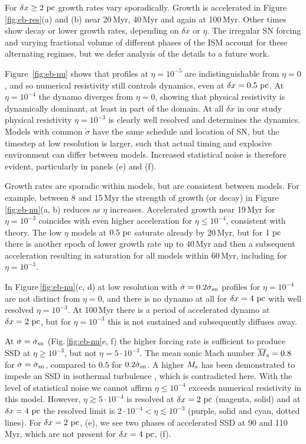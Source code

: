 \documentclass[preprint2]{aastex63}
\newcommand\SNr{\dot\sigma_{\rm sn}}
\newcommand\Ms{M_{\rm s}}
\newcommand\pc{~ {\rm pc}}
\newcommand\dx{ {\delta x}}
\begin{document}
 For $\dx\geq2\pc$ growth rates vary sporadically.
 Growth is accelerated in Figure\,\ref{fig:eb-res}(a) and (b) near 20\,Myr,
 40\,Myr and again at 100\,Myr.
 Other times show decay or lower growth rates, depending on $\dx$ or $\eta$.
 The irregular SN forcing and varying fractional volume of different phases of
 the ISM account for these alternating regimes, but we defer analysis of the
 details to a future work.
 

 Figure~\ref{fig:eb-nu} shows that profiles at $\eta=10^{-5}$ are
 indistinguishable from $\eta=0$, and so numerical resistivity still controls
 dynamics, even at $\delta x = 0.5\pc$.
 At $\eta=10^{-4}$ the dynamo diverges from $\eta=0$, showing that physical
 resistivity is dynamically dominant, at least in part of the domain.
 At all $\dx$ in our study physical resistivity $\eta=10^{-3}$ is clearly well
 resolved and determines the dynamics.
 Models with common $\dot\sigma$ have the same schedule and location of SN,
 but the timestep at low resolution is larger, such that actual timing and
 explosive environment can differ between models.
 Increased statistical noise is therefore evident, particularly in panels (e)
 and (f).

 Growth rates are sporadic within models, but are consistent between models.
 For example, between 8 and 15\,Myr the strength of growth (or decay) in 
 Figure\,\ref{fig:eb-nu}(a, b) reduces as $\eta$ increases.
 Accelerated growth near 19\,Myr for $\eta=10^{-3}$ coincides with even higher
 acceleration for $\eta\le10^{-4}$, consistent with theory.
 The low $\eta$ models at $0.5\pc$ saturate already by 20\,Myr, but for $1\pc$
 there is another epoch of lower growth rate up to 40\,Myr and then a
 subsequent acceleration resulting in saturation for all models within
 60\,Myr, including for $\eta=10^{-3}$.

 In Figure\,\ref{fig:eb-nu}(c, d) at low resolution with $\dot\sigma=0.2\SNr$
 profiles for $\eta=10^{-4}$ are not distinct from $\eta=0$, and there is no
 dynamo at all for $\dx=4\pc$ with well resolved $\eta=10^{-3}$.
 At 100\,Myr there is a period of accelerated dynamo at $\dx=2\pc$, but 
 for $\eta=10^{-3}$ this is not sustained and subsequently diffuses away.

 At $\dot\sigma=\SNr$ (Fig.\,\ref{fig:eb-nu}e, f) the higher forcing rate is
 sufficient to produce SSD at $\eta\geq10^{-3}$, but not $\eta=5\cdot10^{-3}$.
 The mean sonic Mach number $\overline\Ms=0.8$ for $\dot\sigma=\SNr$, compared
 to $0.5$ for $0.2\SNr$.
 A higher $\Ms$ has been demonstrated to impede an SSD in isothermal turbulence
 \citep{Haugen:2004M}, which is contradicted here.
 With the level of statistical noise we cannot affirm $\eta\leq10^{-4}$ exceeds
 numerical resistivity in this model. 
 However, $\eta\gtrsim5\cdot10^{-4}$ is resolved at $\dx=2\pc$ (magenta, solid)
 and at $\dx=4\pc$ the resolved limit is $2\cdot10^{-4}<\eta\lesssim10^{-3}$
 (purple, solid and cyan, dotted lines).
 For $\dx=2\pc$, (e), we see two phases of accelerated SSD at 90 and 110\,Myr,
 which are not present for $\dx=4\pc$, (f).
\end{document}
